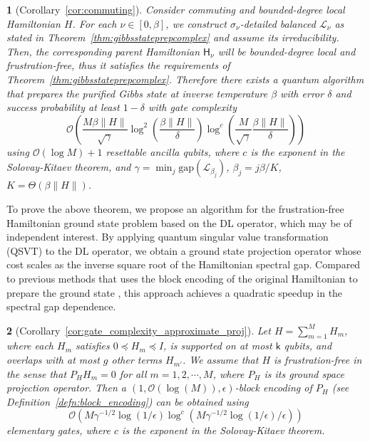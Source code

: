\documentclass{article}
\newtheorem{thm}{\protect\theoremname}
\theoremstyle{plain}
\theoremstyle{plain}
\theoremstyle{plain}
\theoremstyle{plain}
\theoremstyle{plain}
\theoremstyle{plain}
\theoremstyle{plain}
\providecommand{\theoremname}{Theorem}
\newcommand{\norm}[1]{\lVert #1 \rVert}
\newcommand{\Or}{\mathcal{O}}
\newcommand{\calL}{\ensuremath{\mathcal{L}}}
\newcommand{\sfH}{\ensuremath{\mathsf{H}}}
\newcommand{\calO}{\ensuremath{\mathcal{O}}}
\begin{document}
\begin{thm}[Corollary~\ref{cor:commuting}]
\label{thm:commuting_main}
    Consider commuting and bounded-degree local Hamiltonian $H$. For each $\nu\in [0, \beta]$, we construct $\sigma_\nu$-detailed balanced $\calL_\nu$ as stated in Theorem~\ref{thm:gibbsstateprepcomplex}
    and assume its irreducibility. Then, the corresponding parent Hamiltonian $\sfH_\nu$ will be bounded-degree local and frustration-free, thus it satisfies the requirements of Theorem~\ref{thm:gibbsstateprepcomplex}. Therefore there exists a quantum algorithm that prepares the purified Gibbs state at inverse temperature $\beta$ with error $\delta$ and success probability at least $1-\delta$ with gate complexity
    \begin{equation}
        \calO \left( \frac{M\beta \norm{H}}{\sqrt{\gamma}} \log^2 \left(\frac{\beta\norm{H}}{\delta}\right) \log^c \left( \frac{M}{\sqrt{\gamma}} \frac{\beta\norm{H}}{\delta} 
        \right) \right)
    \end{equation} using $\calO (\log M) + 1$ resettable ancilla qubits, where $c$ is the exponent in the Solovay-Kitaev theorem, and $\gamma = \min_j \mathrm{gap}(\mathcal{L}_{\beta_j})$, $\beta_j = j\beta/K$, $K=\Theta(\beta\|H\|)$.
\end{thm}

To prove the above theorem, we propose an algorithm for the frustration-free Hamiltonian ground state problem based on the DL operator, which may be of independent interest. By applying quantum singular value transformation (QSVT) \cite{Gilyen_2019singularvalue} to the DL operator, we obtain a ground state projection operator whose cost scales as the inverse square root of the Hamiltonian spectral gap. Compared to previous methods that uses the block encoding of the original Hamiltonian to prepare the ground state \cite{LinTong2020,Ge2018fastergroundstatepreparation}, this approach achieves a quadratic speedup in the spectral gap dependence.
\begin{thm}[Corollary~\ref{cor:gate_complexity_approximate_proj}]
    \label{cor:gate_complexity_approximate_proj_main}
    Let $H = \sum_{m=1}^M H_m$, where each $H_m$ satisfies $0\preceq H_m\preceq I$, is supported on at most $\mathsf{k}$ qubits, and overlaps with at most $g$ other terms $H_{m'}$. We assume that $H$ is frustration-free in the sense that $P_H H_m=0$ for all $m=1,2,\cdots,M$, where $P_H$ is its ground space projection operator. Then a $(1,\Or(\log(M)),\epsilon)$-block encoding of $P_H$ (see Definition~\ref{defn:block_encoding}) can be obtained using 
    \[
    \Or\left(M\gamma^{-1/2}\log(1/\epsilon)\log^c(M\gamma^{-1/2}\log(1/\epsilon)/\epsilon)\right)
    \]
    elementary gates, where $c$ is the exponent in the Solovay-Kitaev theorem.
\end{thm}
\end{document}
